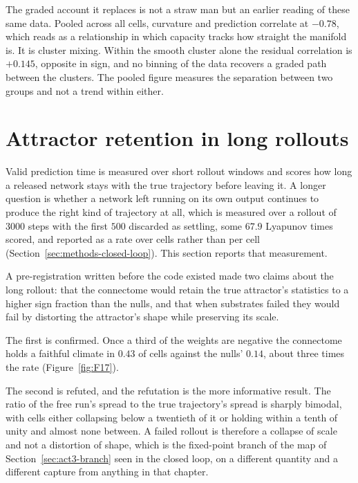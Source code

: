 The graded account it replaces is not a straw man but an earlier reading of these
same data. Pooled across all cells, curvature and prediction correlate at
$-0.78$, %
which reads as a relationship in which capacity tracks how straight the manifold
is. It is cluster mixing. Within the smooth cluster alone the residual
correlation is
$+0.145$, %
opposite in sign, and no binning of the data recovers a graded path between the
clusters. The pooled figure measures the separation between two groups and not a
trend within either.




\section{Attractor retention in long rollouts}
\label{app:long-rollout}
\bigskip

Valid prediction time is measured over short rollout windows and scores how long
a released network stays with the true trajectory before leaving it. A longer
question is whether a network left running on its own output continues to
produce the right kind of trajectory at all, which is measured over a rollout of
$3000$ %
steps with the first
$500$ %
discarded as settling, some
$67.9$ %
Lyapunov times scored, and reported as a rate over cells rather than per cell
(Section~\ref{sec:methods-closed-loop}). This section reports that measurement.

A pre-registration written before the code existed made two claims about the
long rollout: that the connectome would retain the true attractor's statistics to
a higher sign fraction than the nulls, and that when substrates failed they would
fail by distorting the attractor's shape while preserving its scale.

The first is confirmed. Once a third of the weights are negative the connectome
holds a faithful climate in
$0.43$ %
of cells against the nulls'
$0.14$, %
about three times the rate (Figure~\ref{fig:F17}).

The second is refuted, and the refutation is the more informative result. The
ratio of the free run's spread to the true trajectory's spread is sharply
bimodal, with cells either collapsing below a twentieth of it or holding within a
tenth of unity and almost none between. A failed rollout is therefore a collapse
of scale and not a distortion of shape, which is the fixed-point branch of the
map of Section~\ref{sec:act3-branch} seen in the closed loop, on a different
quantity and a different capture from anything in that chapter.

